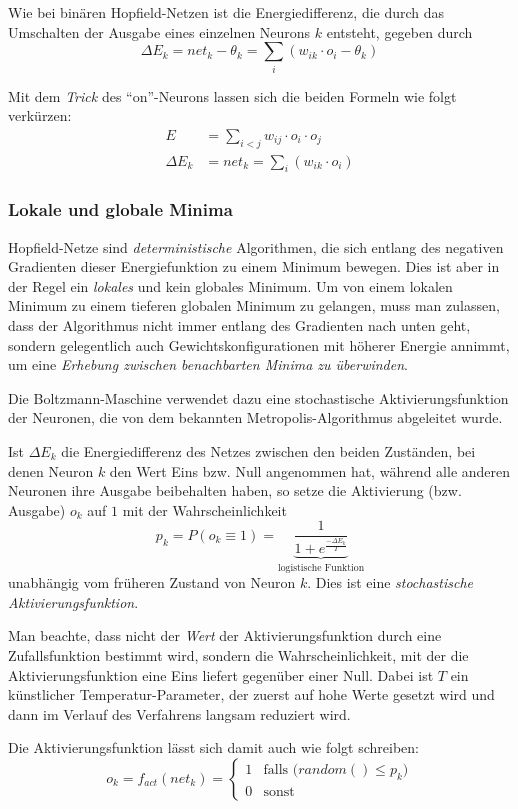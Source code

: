 Wie bei binären Hopfield-Netzen ist die Energiedifferenz, die durch das Umschalten der Ausgabe eines einzelnen Neurons $k$ entsteht, gegeben durch
\[
	\Delta E_k = net_k - \theta_k = \sum_i (w_{ik} \cdot o_i - \theta_k)
\]

Mit dem \emph{Trick} des "`on"'-Neurons lassen sich die beiden Formeln wie folgt verkürzen:
\begin{align*}
	E &= \sum_{i < j} w_{ij} \cdot o_i \cdot o_j \\
	\Delta E_k &= net_k = \sum_i (w_{ik} \cdot o_i)
\end{align*}


\subsubsection*{Lokale und globale Minima}
Hopfield-Netze sind \emph{deterministische} Algorithmen, die sich entlang des negativen Gradienten dieser Energiefunktion zu einem Minimum bewegen. Dies ist aber in der Regel ein \emph{lokales} und kein globales Minimum.
Um von einem lokalen Minimum zu einem tieferen globalen Minimum zu gelangen, muss man zulassen, dass der Algorithmus nicht immer entlang des Gradienten nach unten geht, sondern gelegentlich auch Gewichtskonfigurationen mit höherer Energie annimmt, um eine \emph{Erhebung zwischen benachbarten Minima zu überwinden}.

Die Boltzmann-Maschine verwendet dazu eine stochastische Aktivierungsfunktion der Neuronen, die von dem bekannten Metropolis-Algorithmus abgeleitet wurde.

Ist  $\Delta E_k$ die Energiedifferenz des Netzes zwischen den beiden Zuständen, bei denen Neuron $k$ den Wert Eins bzw. Null angenommen hat, während alle anderen Neuronen ihre Ausgabe beibehalten haben, so setze die Aktivierung (bzw. Ausgabe) $o_k$ auf $1$ mit der Wahrscheinlichkeit
\[
	p_k = P(o_k \equiv 1) = \underbrace{ \frac{1}{1 + e^{\frac{-\Delta E_k}{T}}}}_{\text{logistische Funktion}}
\]
unabhängig vom früheren Zustand von Neuron $k$. Dies ist eine \emph{stochastische Aktivierungsfunktion}.

Man beachte, dass nicht der \emph{Wert} der Aktivierungsfunktion durch eine Zufallsfunktion bestimmt wird, sondern die Wahrscheinlichkeit, mit der
die Aktivierungsfunktion eine Eins liefert gegenüber einer Null.
Dabei ist $T$ ein künstlicher Temperatur-Parameter, der zuerst auf hohe Werte gesetzt wird und dann im Verlauf des Verfahrens langsam reduziert wird.

Die Aktivierungsfunktion lässt sich damit auch wie folgt schreiben:
\[
	o_k = f_{act}(net_k) = 
	\begin{cases}
		1 &\text{falls } \big( random() \le p_k \big) \\
		0 &\text{sonst}
	\end{cases}
\]

